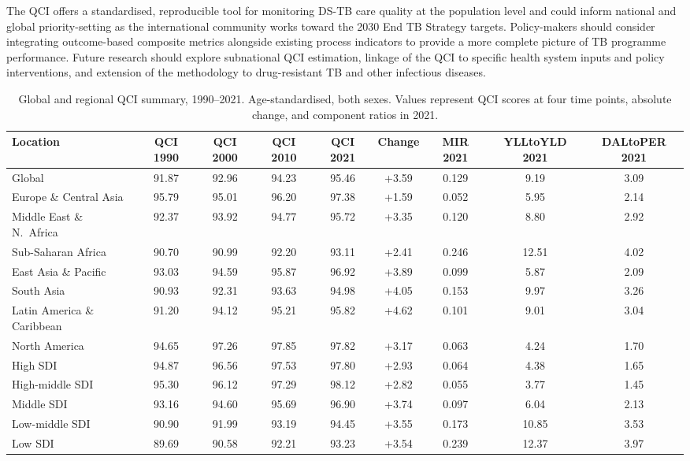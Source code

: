 \documentclass[12pt]{article}
\begin{document}
The QCI offers a standardised, reproducible tool for monitoring DS-TB care quality at the population level and could inform national and global priority-setting as the international community works toward the 2030 End TB Strategy targets. Policy-makers should consider integrating outcome-based composite metrics alongside existing process indicators to provide a more complete picture of TB programme performance. Future research should explore subnational QCI estimation, linkage of the QCI to specific health system inputs and policy interventions, and extension of the methodology to drug-resistant TB and other infectious diseases.


\clearpage

\begin{table}[htbp]
\centering
\caption{Global and regional QCI summary, 1990--2021. Age-standardised, both sexes. Values represent QCI scores at four time points, absolute change, and component ratios in 2021.}
\label{tab:table1}
\small
\begin{tabular}{lcccccccc}
\toprule
Location & QCI 1990 & QCI 2000 & QCI 2010 & QCI 2021 & Change & MIR 2021 & YLLtoYLD 2021 & DALtoPER 2021 \\
\midrule
Global & 91.87 & 92.96 & 94.23 & 95.46 & +3.59 & 0.129 & 9.19 & 3.09 \\
Europe \& Central Asia & 95.79 & 95.01 & 96.20 & 97.38 & +1.59 & 0.052 & 5.95 & 2.14 \\
Middle East \& N.\ Africa & 92.37 & 93.92 & 94.77 & 95.72 & +3.35 & 0.120 & 8.80 & 2.92 \\
Sub-Saharan Africa & 90.70 & 90.99 & 92.20 & 93.11 & +2.41 & 0.246 & 12.51 & 4.02 \\
East Asia \& Pacific & 93.03 & 94.59 & 95.87 & 96.92 & +3.89 & 0.099 & 5.87 & 2.09 \\
South Asia & 90.93 & 92.31 & 93.63 & 94.98 & +4.05 & 0.153 & 9.97 & 3.26 \\
Latin America \& Caribbean & 91.20 & 94.12 & 95.21 & 95.82 & +4.62 & 0.101 & 9.01 & 3.04 \\
North America & 94.65 & 97.26 & 97.85 & 97.82 & +3.17 & 0.063 & 4.24 & 1.70 \\
\midrule
High SDI & 94.87 & 96.56 & 97.53 & 97.80 & +2.93 & 0.064 & 4.38 & 1.65 \\
High-middle SDI & 95.30 & 96.12 & 97.29 & 98.12 & +2.82 & 0.055 & 3.77 & 1.45 \\
Middle SDI & 93.16 & 94.60 & 95.69 & 96.90 & +3.74 & 0.097 & 6.04 & 2.13 \\
Low-middle SDI & 90.90 & 91.99 & 93.19 & 94.45 & +3.55 & 0.173 & 10.85 & 3.53 \\
Low SDI & 89.69 & 90.58 & 92.21 & 93.23 & +3.54 & 0.239 & 12.37 & 3.97 \\
\bottomrule
\end{tabular}
\end{table}
\end{document}
